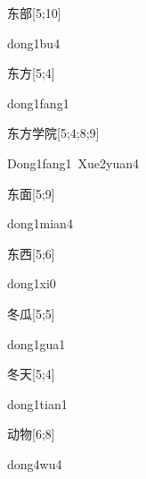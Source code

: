 \begin{verbete}[dong1bu4]{东部}[5;10]
\begin{pronuncia}{dong1bu4}
\end{pronuncia}
\end{verbete}

\begin{verbete}{东方}[5;4]
\begin{pronuncia}{dong1fang1}
\end{pronuncia}
\end{verbete}

\begin{verbete}{东方学院}[5;4;8;9]
\begin{pronuncia}[\\]{Dong1fang1\ Xue2yuan4}
\end{pronuncia}
\end{verbete}

\begin{verbete}{东面}[5;9]
\begin{pronuncia}{dong1mian4}
\end{pronuncia}
\end{verbete}

\begin{verbete}[dong1xi0]{东西}[5;6]
\begin{pronuncia}{dong1xi0}
\end{pronuncia}
\end{verbete}

\begin{verbete}{冬瓜}[5;5]
\begin{pronuncia}{dong1gua1}
\end{pronuncia}
\end{verbete}

\begin{verbete}{冬天}[5;4]
\begin{pronuncia}{dong1tian1}
\end{pronuncia}
\end{verbete}

\begin{verbete}[dong4wu4]{动物}[6;8]
\begin{pronuncia}{dong4wu4}
\end{pronuncia}
\end{verbete}


